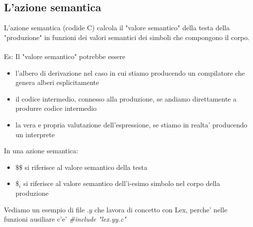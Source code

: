 \documentclass[a4paper,12pt]{article}
\begin{document}
{\subsection{L'azione semantica}
L'azione semantica (codide C) calcola il "valore semantico" della testa della "produzione" in funzioni dei valori semantici dei simboli che compongono il corpo. \\
\vspace{5px}\\
Es: Il "valore semantico" potrebbe essere
\begin{itemize}
  \item l'albero di derivazione nel caso in cui stiamo producendo un compilatore che genera alberi esplicitamente
  \item il codice intermedio, connesso alla produzione, se andiamo direttamente a produrre codice intermedio
  \item la vera e propria valutazione dell'espressione, se stiamo in realta' producendo un interprete
\end{itemize}
In una azione semantica:
\begin{itemize}
  \item $\mathdollar \mathdollar$ si riferisce al valore semantico della testa
  \item $\mathdollar_i$ si riferisce al valore semantico dell'i-esimo simbolo nel corpo della produzione
\end{itemize}
Vediamo un esempio di file $.y$ che lavora di concetto con Lex, perche' nelle funzioni ausiliare c'e' \textit{\#include "lex.yy.c"}
}
\end{document}
